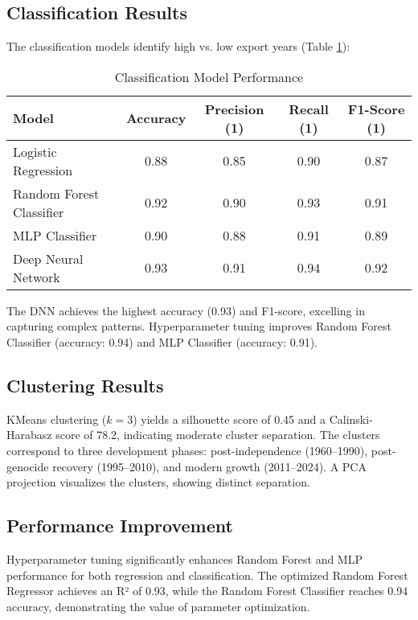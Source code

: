 \documentclass[12pt]{article}
\begin{document}
	\subsection{Classification Results}
	The classification models identify high vs. low export years (Table \ref{tab:classification}):
	\begin{table}[H]
		\centering
		\caption{Classification Model Performance}
		\begin{tabular}{lcccc}
			\toprule
			Model & Accuracy & Precision (1) & Recall (1) & F1-Score (1) \\
			\midrule
			Logistic Regression & 0.88 & 0.85 & 0.90 & 0.87 \\
			Random Forest Classifier & 0.92 & 0.90 & 0.93 & 0.91 \\
			MLP Classifier & 0.90 & 0.88 & 0.91 & 0.89 \\
			Deep Neural Network & 0.93 & 0.91 & 0.94 & 0.92 \\
			\bottomrule
		\end{tabular}
		\label{tab:classification}
	\end{table}
	The DNN achieves the highest accuracy (0.93) and F1-score, excelling in capturing complex patterns. Hyperparameter tuning improves Random Forest Classifier (accuracy: 0.94) and MLP Classifier (accuracy: 0.91).
	
	\subsection{Clustering Results}
	KMeans clustering (\( k=3 \)) yields a silhouette score of 0.45 and a Calinski-Harabasz score of 78.2, indicating moderate cluster separation. The clusters correspond to three development phases: post-independence (1960–1990), post-genocide recovery (1995–2010), and modern growth (2011–2024). A PCA projection visualizes the clusters, showing distinct separation.
	
	\subsection{Performance Improvement}
	Hyperparameter tuning significantly enhances Random Forest and MLP performance for both regression and classification. The optimized Random Forest Regressor achieves an R² of 0.93, while the Random Forest Classifier reaches 0.94 accuracy, demonstrating the value of parameter optimization.
	
\end{document}
